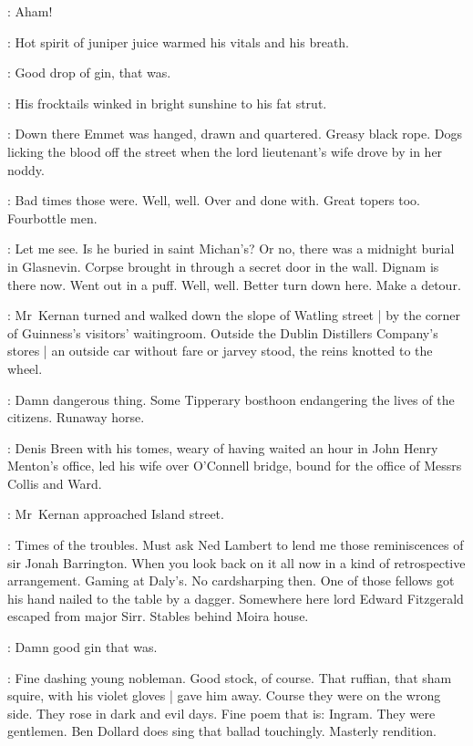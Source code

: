 :
Aham!

:
Hot spirit of juniper juice warmed his vitals and his breath.

:
Good drop of gin, that was.

:
His frocktails winked in bright sunshine to his fat strut.

:
Down there Emmet was hanged, drawn and quartered.
Greasy black rope.
Dogs licking the blood off the street
when the lord lieutenant's wife drove by in her noddy.

:
Bad times those were.
Well, well.
Over and done with.
Great topers too.
Fourbottle men.

:
Let me see.
Is he buried in saint Michan's?
Or no, there was a midnight burial in Glasnevin.%
Corpse brought in through a secret door in the wall.
Dignam is there now.
Went out in a puff.
Well, well.
Better turn down here.
Make a detour.

:
Mr~Kernan turned and walked down the slope of Watling street |
by the corner of Guinness's visitors' waitingroom.
Outside the Dublin Distillers Company's stores |
an outside car without fare or jarvey stood,
the reins knotted to the wheel.

:
Damn dangerous thing.
Some Tipperary bosthoon
endangering the lives of the citizens.
Runaway horse.

\begin{interject}
    :
    Denis Breen with his tomes,
    weary of having waited an hour in John Henry Menton's office,
    led his wife over O'Connell bridge,
    bound for the office
    of Messrs Collis and Ward.
\end{interject}%

:
Mr~Kernan approached Island street.

:
Times of the troubles.
Must ask Ned Lambert to lend me
those reminiscences of sir Jonah Barrington.
When you look back on it all now
in a kind of retrospective arrangement.
Gaming at Daly's.
No cardsharping then.
One of those fellows got his hand nailed to the table by a dagger.
Somewhere here lord Edward Fitzgerald escaped from major Sirr.
Stables behind Moira house.

:
Damn good gin that was.

:
Fine dashing young nobleman.
Good stock, of course.
That ruffian, that sham squire, with his violet gloves |
gave him away.
Course they were on the wrong side.%
They rose in dark and evil days.
Fine poem that is:
Ingram.
They were gentlemen.
Ben Dollard does sing that ballad touchingly.
Masterly rendition.

